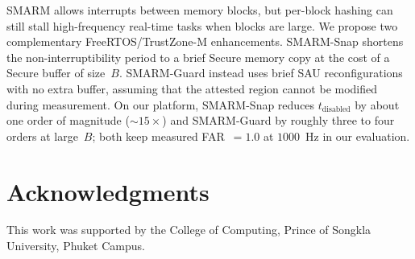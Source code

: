 \documentclass[conference]{IEEEtran}
\newcommand{\tdis}{$t_{\mathrm{disabled}}$\xspace}
\newcommand{\smarmcopy}{SMARM-Snap\xspace}
\newcommand{\smarmlock}{SMARM-Guard\xspace}
\begin{document}
SMARM allows interrupts between memory blocks, but per-block hashing can still stall high-frequency real-time tasks when blocks are large. We propose two complementary FreeRTOS/TrustZone-M enhancements. \smarmcopy{} shortens the non-interruptibility period to a brief Secure memory copy at the cost of a Secure buffer of size~$B$. \smarmlock{} instead uses brief SAU reconfigurations with no extra buffer, assuming that the attested region cannot be modified during measurement. On our platform, \smarmcopy{} reduces \tdis{} by about one order of magnitude ($\sim\!\!15\times$) and \smarmlock{} by roughly three to four orders at large~$B$; both keep measured FAR~$=1.0$ at $1000$~Hz in our evaluation.


\section*{Acknowledgments}
This work was supported by the College of Computing,
Prince of Songkla University, Phuket Campus.



{\footnotesize


}
\end{document}
